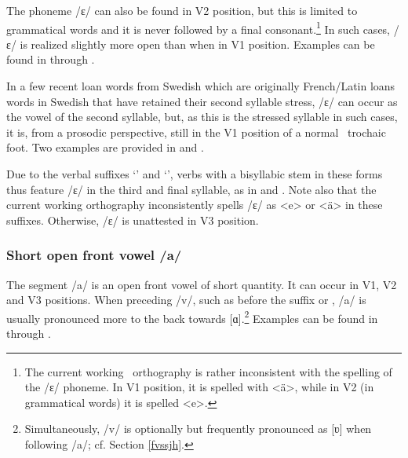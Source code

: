 The phoneme /ɛ/ can also be found in V2 position, but this is limited to grammatical words and it is never followed by a final consonant.\footnote{The current working \PS\ orthography is rather inconsistent with the spelling of the /ɛ/ phoneme. In V1 position, it is spelled with <ä>, while in V2 (in grammatical words) it is spelled <e>.} %
In such cases, /ɛ/ is realized slightly more open than when in V1 position. Examples can be found in  through .

In a few recent loan words from Swedish which are originally French/Latin loans words in Swedish that have retained their second syllable stress, /ɛ/ can occur as the vowel of the second syllable, but, as this is the stressed syllable in such cases, it is, from a prosodic perspective, still in the V1 position of a normal \PS\ trochaic foot. Two examples are provided in  and .

Due to the verbal suffixes  ‘’ and  ‘’, verbs with a bisyllabic stem in these forms thus feature /ɛ/ in the third and final syllable, as in  and . 
Note also that the current working orthography inconsistently spells /ɛ/ as <e> or <ä> in these suffixes. 
Otherwise, /ɛ/ is unattested in V3 position.



\subsubsection{Short open front vowel /a/}
The segment /a/ is an open front vowel of short quantity. It can occur in V1, V2 and V3 positions. When preceding /v/, such as before the suffix   or  , /a/ is usually pronounced more to the back towards [ɑ].\footnote{Simultaneously, /v/ is optionally but frequently pronounced as [ʋ] when following /a/; cf. Section \ref{fvssjh}.} 
Examples can be found in  through .

